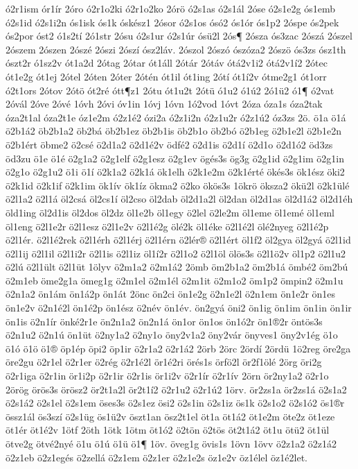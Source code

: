 {ó2r1ism
ór1ír
2óro
ó2r1o2ki
ó2r1o2ko
2órö
ó2s1as
ó2s1ál
2óse
ó2s1e2g
ós1emb
ó2s1id
ó2s1i2n
ós1isk
ós1k
óskész1
2ósor
ó2s1os
ósó2
ós1ór
ós1p2
2óspe
ós2pek
ós2por
óst2
ó1s2tí
2ó1str
2ósu
ó2s1ur
ó2s1úr
ósü2l
2ós¶
2ósza
ós3zac
2ószá
2ószel
2ószem
2ószen
2ószé
2ószi
2ószí
ósz2láv.
2ószol
2ószó
ószóza2
2ószö
ós3zs
ósz1th
ószt2r
ó1sz2v
ót1a2d
2ótag
2ótar
ót1áll
2ótár
2ótáv
ótá2v1i2
ótá2v1í2
2ótec
ót1e2g
ót1ej
2ótel
2óten
2óter
2ótén
ót1il
ót1ing
2ótí
ót1í2v
ótme2g1
ót1orr
ó2t1ors
2ótov
2ótö
ót2ré
ótt¶z1
2ótu
ót1u2t
2ótü
ó1u2
ó1ú2
2ó1ü2
ó1¶
ó2vat
2óvál
2óve
2óvé
1óvh
2óvi
óv1in
1óvj
1óvn
1ó2vod
1óvt
2óza
óza1s
óza2tak
óza2t1al
óza2t1e
óz1e2m
ó2z1é2
ózi2a
ó2z1i2n
ó2z1u2r
ó2z1ú2
óz3zs
2ö.
ö1a
ö1á
ö2b1á2
öb2b1a2
öb2bá
öb2b1ez
öb2b1is
öb2b1o
öb2bó
ö2b1eg
ö2b1e2l
ö2b1e2n
ö2b1ért
öbme2
ö2csé
ö2d1a2
ö2d1é2v
ödfé2
ö2d1is
ö2d1í
ö2d1o
ö2d1ó2
öd3zs
öd3zu
ö1e
ö1é
ö2g1a2
ö2g1elf
ö2g1esz
ö2g1ev
ögés3s
ög3g
ö2g1id
ö2g1im
ö2g1in
ö2g1o
ö2g1u2
ö1i
ö1í
ö2k1a2
ö2k1á
ök1elh
ö2k1e2m
ö2k1érté
ökés3s
ök1ész
öki2
ö2k1id
ö2k1if
ö2k1im
ök1ív
ök1íz
ökma2
ö2ko
ökös3s
1ökrö
öksza2
ökü2l
ö2k1ülé
ö2l1a2
ö2l1á
öl2csá
öl2cs1í
öl2cso
öl2dab
öl2d1a2l
öl2dan
öl2d1as
öl2d1á2
öl2d1éh
öld1ing
öl2d1is
öl2dos
öl2dz
öl1e2b
öl1egy
ö2lel
ö2le2m
öl1eme
öl1emé
öl1eml
öl1eng
ö2l1e2r
ö2l1esz
ö2l1e2v
ö2l1é2g
ölé2k
öl1éke
ö2l1é2l
ölé2nyeg
ö2l1é2p
ö2l1ér.
ö2l1é2rek
ö2l1érh
ö2l1érj
ö2l1érn
ö2lér®
ö2l1ért
öl1f2
öl2gya
öl2gyá
ö2l1id
ö2l1ij
ö2l1il
ö2l1i2r
ö2l1is
ö2l1iz
öl1í2r
ö2l1o2
ö2l1öl
ölös3s
ö2l1ö2v
öl1p2
ö2l1u2
ö2lú
ö2l1ült
ö2l1üt
1ölyv
ö2m1a2
ö2m1á2
2ömb
öm2b1a2
öm2b1á
ömbé2
öm2bú
ö2m1eb
öme2g1a
ömeg1g
ö2m1el
ö2m1él
ö2m1it
ö2m1o2
öm1p2
ömpin2
ö2m1u
ö2n1a2
ön1ám
ön1á2p
ön1át
2önc
ön2ci
ön1e2g
ö2n1e2l
ö2n1em
ön1e2r
ön1es
ön1e2v
ö2n1é2l
ön1é2p
ön1ész
ö2név
ön1év.
ön2gyá
öni2
ön1ig
ön1im
ön1in
ön1ir
ön1is
ö2n1ír
önké2r1e
ön2n1a2
ön2n1á
ön1or
ön1os
ön1ó2r
ön1®2r
öntös3s
ö2n1u2
ö2n1ú
ön1üt
ö2ny1a2
ö2ny1o
öny2v1a2
öny2vár
önyves1
öny2v1ég
ö1o
ö1ó
ö1ö
ö1®
öp1ép
öpi2
öp1ir
ö2r1a2
ö2r1á2
2örb
2örc
2ördí
2ördü
1ö2reg
öre2ga
öre2gu
ö2r1el
ö2r1er
ö2rég
ö2r1é2l
ör1é2ri
örés1s
örfö2l
ör2f1ölé
2örg
öri2g
ö2r1iga
ö2r1in
ör1i2p
ö2r1ir
ö2r1is
ör1i2v
ö2r1ír
ö2r1ív
2örn
ör2ny1a2
ö2r1o
2örög
örös3s
örösz2
ör2t1a2l
ör2t1í2
ö2r1u2
ö2r1ú2
1örv.
ör2zs1a
ör2zs1á
ö2s1a2
ö2s1á2
ö2s1el
ö2s1em
öses3s
ö2s1ez
ösi2
ö2s1in
ö2s1iz
ös1k
ö2s1o2
ö2s1ó2
ös1®r
össz1ál
ös3szí
ö2s1üg
ös1ü2v
öszt1an
ösz2t1el
öt1a
öt1á2
öt1e2m
öte2z
öt1eze
öt1ér
öt1é2v
1ötf
2öth
1ötk
1ötm
öt1ó2
ö2tön
ö2tös
öt2t1á2
öt1u
ötü2
öt1ül
ötve2g
ötvé2nyé
ö1u
ö1ú
ö1ü
ö1¶
1öv.
öveg1g
övis1s
1övn
1övv
ö2z1a2
ö2z1á2
ö2z1eb
ö2z1egés
ö2zellá
ö2z1em
ö2z1er
ö2z1e2s
öz1e2v
öz1élel
öz1é2let.
}
